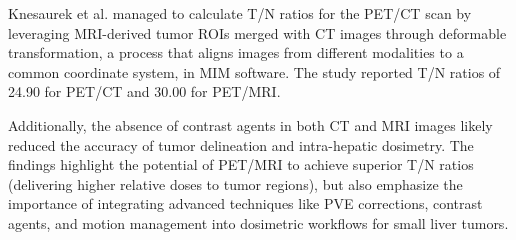 Knesaurek et al. \cite{knesaurek2018} managed to calculate T/N ratios for the PET/CT scan by leveraging MRI-derived tumor ROIs merged with CT images through deformable transformation, a process that aligns images from different modalities to a common coordinate system, in MIM software. The study reported T/N ratios of 24.90 for PET/CT and 30.00 for PET/MRI. 

Additionally, the absence of contrast agents in both CT and MRI images likely reduced the accuracy of tumor delineation and intra-hepatic dosimetry. The findings highlight the potential of PET/MRI to achieve superior T/N ratios (delivering higher relative doses to tumor regions), but also emphasize the importance of integrating advanced techniques like PVE corrections, contrast agents, and motion management into dosimetric workflows for small liver tumors.

